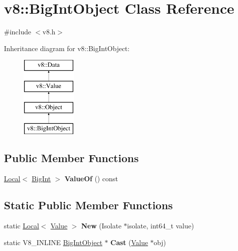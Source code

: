 \hypertarget{classv8_1_1BigIntObject}{}\section{v8\+:\+:Big\+Int\+Object Class Reference}
\label{classv8_1_1BigIntObject}


{\ttfamily \#include $<$v8.\+h$>$}

Inheritance diagram for v8\+:\+:Big\+Int\+Object\+:\begin{figure}[H]
\begin{center}
\leavevmode
\includegraphics[height=4.000000cm]{classv8_1_1BigIntObject}
\end{center}
\end{figure}
\subsection*{Public Member Functions}
\begin{DoxyCompactItemize}
\item 
\mbox{\label{classv8_1_1BigIntObject_a54afb6996195d90226b1b569ca3260e4}} 
\mbox{\hyperlink{classv8_1_1Local}{Local}}$<$ \mbox{\hyperlink{classv8_1_1BigInt}{Big\+Int}} $>$ {\bfseries Value\+Of} () const
\end{DoxyCompactItemize}
\subsection*{Static Public Member Functions}
\begin{DoxyCompactItemize}
\item 
\mbox{\label{classv8_1_1BigIntObject_aeadcd7f6344bad684c97f300715064ee}} 
static \mbox{\hyperlink{classv8_1_1Local}{Local}}$<$ \mbox{\hyperlink{classv8_1_1Value}{Value}} $>$ {\bfseries New} (Isolate $\ast$isolate, int64\+\_\+t value)
\item 
\mbox{\label{classv8_1_1BigIntObject_a0d860e8c61719574ae4517248f4ee667}} 
static V8\+\_\+\+I\+N\+L\+I\+NE \mbox{\hyperlink{classv8_1_1BigIntObject}{Big\+Int\+Object}} $\ast$ {\bfseries Cast} (\mbox{\hyperlink{classv8_1_1Value}{Value}} $\ast$obj)
\end{DoxyCompactItemize}


